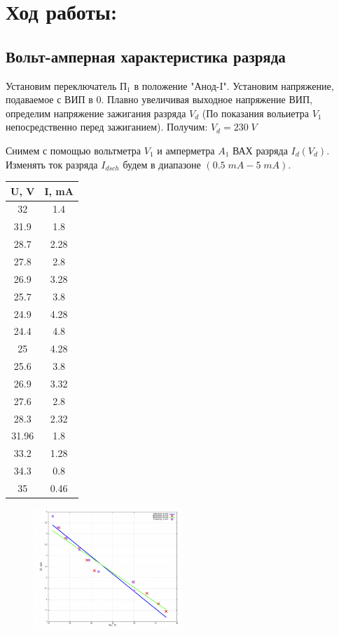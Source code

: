 \documentclass[11pt]{article}
\begin{document}
\section{Ход работы:}

\subsection{Вольт-амперная характеристика разряда}
Установим переключатель \(\text{П}_1\) в положение "Анод-I". Установим напряжение, подаваемое с ВИП в 0.
Плавно увеличивая выходное напряжение ВИП, определим напряжение зажигания разряда \(V_{d}\) (По
показания вольиетра \(V_1\) непосредственно перед зажиганием). Получим: \(V_{d} = 230\; V\)

Снимем с помощью вольтметра \(V_1\) и амперметра \(A_1\) ВАХ разряда \(I_{d}\left(V_{d}\right)\). 
Изменять ток разряда \(I_{dsch}\) будем в диапазоне \(\left(0.5\; mA - 5\; mA\right)\). 

\begin{table}[H]
    \centering
    \begin{tabular}{|c|c|}
    \hline
    U, V  & I, mA \\\hline
    32    & 1.4   \\\hline
    31.9  & 1.8   \\\hline
    28.7  & 2.28  \\\hline
    27.8  & 2.8   \\\hline
    26.9  & 3.28  \\\hline
    25.7  & 3.8   \\\hline
    24.9  & 4.28  \\\hline
    24.4  & 4.8   \\\hline
    25    & 4.28  \\\hline
    25.6  & 3.8   \\\hline
    26.9  & 3.32  \\\hline
    27.6  & 2.8   \\\hline
    28.3  & 2.32  \\\hline
    31.96 & 1.8   \\\hline
    33.2  & 1.28  \\\hline
    34.3  & 0.8   \\\hline
    35    & 0.46  \\\hline
    \end{tabular}
\end{table}

\begin{figure}[H]
    \centering
    \includegraphics[width=0.5\textwidth]{V-A-1.png}
    \label{spec_1}
\end{figure}
\end{document}
